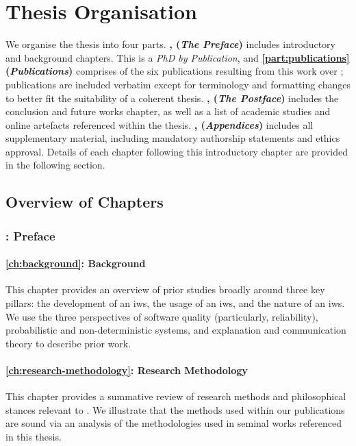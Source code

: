 \section{Thesis Organisation}
\label{sec:introduction:organisation}

We organise the thesis into four parts. \textbf{, (\textit{The Preface})} includes introductory and background chapters. This is a \textit{PhD by Publication}, and \textbf{\cref{part:publications} (\textit{Publications})} comprises of the six publications resulting from this work over ; publications are included verbatim except for terminology and formatting changes to better fit the suitability of a coherent thesis. \textbf{, (\textit{The Postface})} includes the conclusion and future works chapter, as well as a list of academic studies and online artefacts referenced within the thesis. \textbf{, (\textit{Appendices})} includes all supplementary material, including mandatory authorship statements and ethics approval. Details of each chapter following this introductory chapter are provided in the following section.

\subsection{Overview of Chapters}

\subsubsection{: Preface}

\paragraph{\cref{ch:background}: Background} This chapter provides an overview of prior studies broadly around three key pillars: the development of an \gls{iws}, the usage of an \gls{iws}, and the nature of an \gls{iws}. We use the three perspectives of software quality (particularly, reliability), probabilistic and non-deterministic systems, and explanation and communication theory to describe prior work.

\paragraph{\cref{ch:research-methodology}: Research Methodology} This chapter provides a summative review of research methods and philosophical stances relevant to . We illustrate that the methods used within our publications are sound via an analysis of the methodologies used in seminal works referenced in this thesis.

